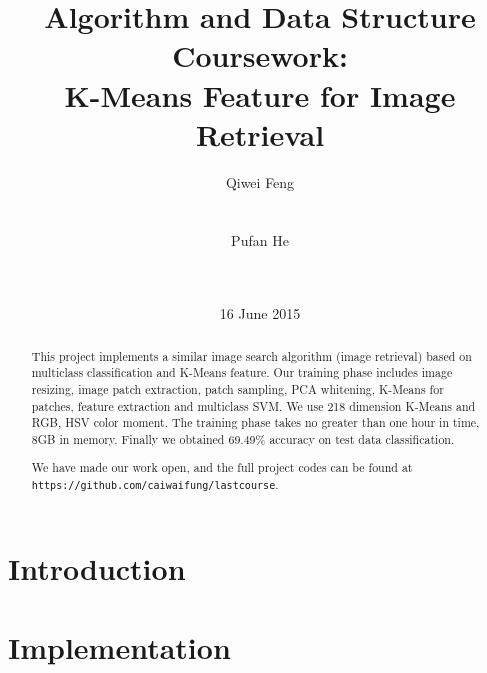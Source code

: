 \documentclass{acm_proc_article-sp}
\begin{document}
\title{Algorithm and Data Structure Coursework: \\K-Means Feature for
Image Retrieval}
\subtitle{}
%
%
\author{\alignauthor
Qiwei Feng\\
       \\
       \\
\alignauthor
Pufan He\\
       \\
       \\
}
\date{16 June 2015}

\maketitle
\begin{abstract}
        This project implements a similar image search algorithm (image
        retrieval) based on multiclass classification and K-Means feature. Our
        training phase includes image resizing, image patch extraction, patch
        sampling, PCA whitening, K-Means for patches, feature extraction and
        multiclass SVM. We use 218 dimension K-Means and RGB, HSV color moment.
        The training phase takes no greater than one hour in time, 8GB in memory.
        Finally we obtained 69.49\% accuracy on test data classification.

We have made our work open, and the full project codes can be found at
\texttt{https://github.com/caiwaifung/lastcourse}.
\end{abstract}


\section{Introduction}

\section{Implementation}
\end{document}
